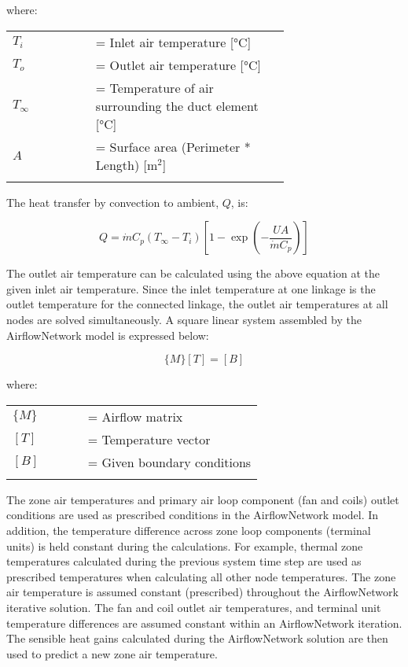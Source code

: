 where:

\begin{tabular}{lp{0.7\linewidth}}
\\
$T_i$ &= Inlet air temperature [°C]\\
$T_o$ &= Outlet air temperature [°C]\\
$T_\infty$ &= Temperature of air surrounding the duct element [°C]\\
$A$ &= Surface area (Perimeter * Length) [m\(^{2}\)]\\
\\
\end{tabular}

The heat transfer by convection to ambient, $Q$, is:

\begin{equation}
Q = \dot{m} {C_p}(T_\infty- T_i)\left[1 - \exp \left( - \frac{UA}{\dot{m} C_p} \right) \right]
\end{equation}

The outlet air temperature can be calculated using the above equation at the given inlet air temperature. Since the inlet temperature at one linkage is the outlet temperature for the connected linkage, the outlet air temperatures at all nodes are solved simultaneously. A square linear system assembled by the AirflowNetwork model is expressed below:

\begin{equation}
\{ M\} [T] = [B]
\end{equation}

where:

\begin{tabular}{lp{0.7\linewidth}}
\\
$\{M\}$ &= Airflow matrix\\
$[T]$ &= Temperature vector\\
$[B]$ &= Given boundary conditions\\
\\
\end{tabular}

The zone air temperatures and primary air loop component (fan and coils) outlet conditions are used as prescribed conditions in the AirflowNetwork model. In addition, the temperature difference across zone loop components (terminal units) is held constant during the calculations. For example, thermal zone temperatures calculated during the previous system time step are used as prescribed temperatures when calculating all other node temperatures. The zone air temperature is assumed constant (prescribed) throughout the AirflowNetwork iterative solution. The fan and coil outlet air temperatures, and terminal unit temperature differences are assumed constant within an AirflowNetwork iteration. The sensible heat gains calculated during the AirflowNetwork solution are then used to predict a new zone air temperature.

